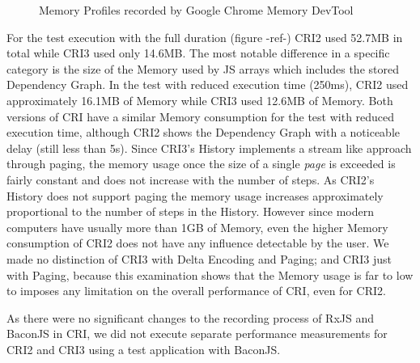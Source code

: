 \begin{figure}[!h]
		\caption{Memory Profiles recorded by Google Chrome Memory DevTool}
	\end{figure}
	
	For the test execution with the full duration (figure -ref-) CRI2 used 52.7MB in total while CRI3 used only 14.6MB. The most notable difference in a specific category is the size of the Memory used by JS arrays which includes the stored Dependency Graph. In the test with reduced execution time (250ms), CRI2 used approximately 16.1MB of Memory while CRI3 used 12.6MB of Memory. Both versions of CRI have a similar Memory consumption for the test with reduced execution time, although CRI2 shows the Dependency Graph with a noticeable delay (still less than 5s). Since CRI3's History implements a stream like approach through paging, the memory usage once the size of a single \emph{page} is exceeded is fairly constant and does not increase with the number of steps. As CRI2's History does not support paging the memory usage increases approximately proportional to the number of steps in the History. However since modern computers have usually more than 1GB of Memory, even the higher Memory consumption of CRI2 does not have any influence detectable by the user. We made no distinction of CRI3 with Delta Encoding and Paging; and CRI3 just with Paging, because this examination shows that the Memory usage is far to low to  imposes any limitation on the overall performance of CRI, even for CRI2.
	
	As there were no significant changes to the recording process of RxJS and BaconJS in CRI, we did not execute separate performance measurements for CRI2 and CRI3 using a test application with BaconJS.
	
